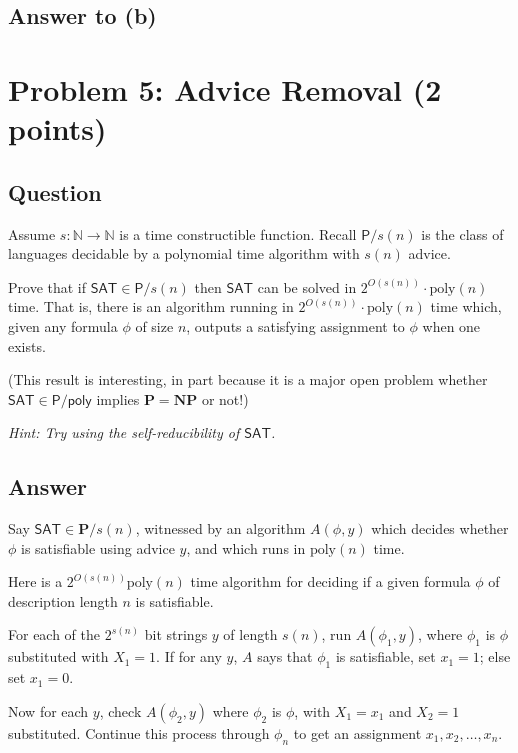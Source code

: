 \documentclass{article}
\renewcommand{\P}{\mathbf{P}}
\newcommand{\NP}{\mathbf{NP}}
\def \N {{\mathbb N}}
\def \poly{\text{poly}}
\begin{document}
\subsection*{Answer to (b)}



\newpage
\section*{Problem 5: Advice Removal (2 points)}

\subsection*{Question}
Assume $s : \N \rightarrow \N$ is a time constructible function. Recall $\mathsf{P}/s(n)$ is the class of languages decidable by a polynomial time algorithm with $s(n)$ advice. 

Prove that if $\textsf{SAT} \in \mathsf{P}/s(n)$ then $\textsf{SAT}$ can be solved in $2^{O(s(n))}\cdot \poly(n)$ time. That is, there is an algorithm running in $2^{O(s(n))}\cdot \poly(n)$ time which, given any formula $\phi$ of size $n$, outputs a satisfying assignment to $\phi$ when one exists.

(This result is interesting, in part because it is a major open problem whether $\textsf{SAT} \in \mathsf{P}/\mathsf{poly}$ implies $\P = \NP$ or not!)

\emph{Hint: Try using the self-reducibility of $\mathsf{SAT}$.}

\subsection*{Answer}

Say $\textsf{SAT} \in \P/s(n)$, witnessed by an algorithm $A(\phi, y)$ which decides whether $\phi$ is satisfiable using advice $y$, and which runs in $\poly(n)$ time.

Here is a $2^{O(s(n))} \poly(n)$ time algorithm for deciding if a given formula $\phi$ of description length $n$ is satisfiable.

For each of the $2^{s(n)}$ bit strings $y$ of length $s(n)$, run $A(\phi_1, y)$, where $\phi_1$ is $\phi$ substituted with $X_1 = 1$.
If for any $y$, $A$ says that $\phi_1$ is satisfiable, set $x_1 = 1$; else set $x_1 = 0$.

Now for each $y$, check $A(\phi_2, y)$ where $\phi_2$ is $\phi$, with $X_1 = x_1$ and $X_2 = 1$ substituted.  Continue this process through $\phi_n$ to get an assignment $x_1, x_2, \dots, x_n$.
\end{document}
